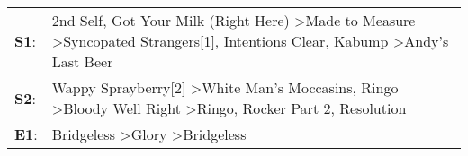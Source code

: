 \begin{supertabular}{p{0.03\textwidth}p{0.92\textwidth}}
 \textbf{S1}:  &  2nd Self\textsuperscript{}, \enspace Got Your Milk (Right Here)\textsuperscript{} \textgreater \enspace Made to Measure\textsuperscript{} \textgreater \enspace Syncopated Strangers[1]\textsuperscript{}, \enspace Intentions Clear\textsuperscript{}, \enspace Kabump\textsuperscript{} \textgreater \enspace Andy's Last Beer\textsuperscript{}  \enspace  \\
 \textbf{S2}:  &                      Wappy Sprayberry[2]\textsuperscript{} \textgreater \enspace White Man's Moccasins\textsuperscript{}, \enspace Ringo\textsuperscript{} \textgreater \enspace Bloody Well Right\textsuperscript{} \textgreater \enspace Ringo\textsuperscript{}, \enspace Rocker Part 2\textsuperscript{}, \enspace Resolution\textsuperscript{}  \enspace  \\
 \textbf{E1}:  &                                                                                                                                                                                                                       Bridgeless\textsuperscript{} \textgreater \enspace Glory\textsuperscript{} \textgreater \enspace Bridgeless\textsuperscript{}  \enspace  \\
\end{supertabular}
